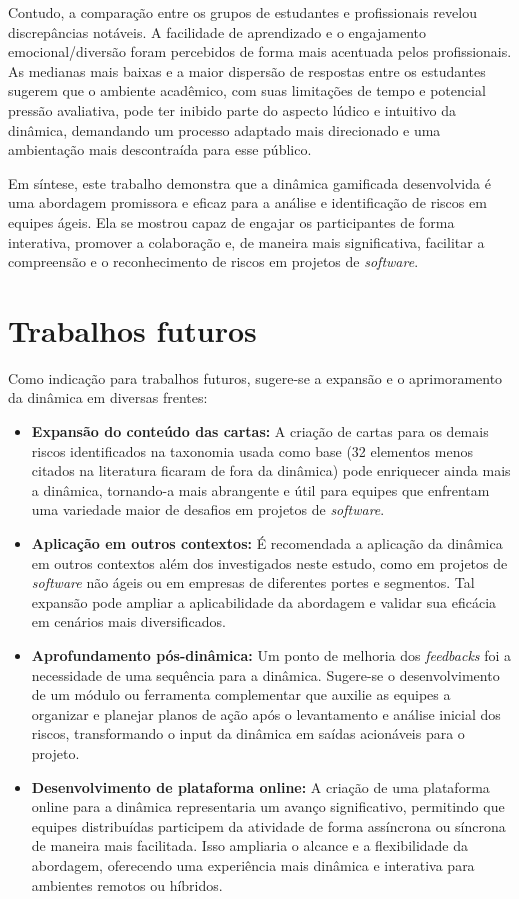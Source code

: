 \documentclass[
	12pt,
	openright,
	twoside,
	a4paper,
	english,
	brazil
	]{abntex2}
\begin{document}
Contudo, a comparação entre os grupos de estudantes e profissionais revelou discrepâncias notáveis. A facilidade de aprendizado e o engajamento emocional/diversão foram percebidos de forma mais acentuada pelos profissionais. As medianas mais baixas e a maior dispersão de respostas entre os estudantes sugerem que o ambiente acadêmico, com suas limitações de tempo e potencial pressão avaliativa, pode ter inibido parte do aspecto lúdico e intuitivo da dinâmica, demandando um processo adaptado mais direcionado e uma ambientação mais descontraída para esse público.

Em síntese, este trabalho demonstra que a dinâmica gamificada desenvolvida é uma abordagem promissora e eficaz para a análise e identificação de riscos em equipes ágeis. Ela se mostrou capaz de engajar os participantes de forma interativa, promover a colaboração e, de maneira mais significativa, facilitar a compreensão e o reconhecimento de riscos em projetos de \textit{software}.

\section{Trabalhos futuros}
\label{sec:trabalhos-futuros}

Como indicação para trabalhos futuros, sugere-se a expansão e o aprimoramento da dinâmica em diversas frentes:

\begin{itemize}
\item \textbf{Expansão do conteúdo das cartas:} A criação de cartas para os demais riscos identificados na taxonomia usada como base \cite{Taxonomy} (32 elementos menos citados na literatura ficaram de fora da dinâmica) pode enriquecer ainda mais a dinâmica, tornando-a mais abrangente e útil para equipes que enfrentam uma variedade maior de desafios em projetos de \textit{software}.
\item \textbf{Aplicação em outros contextos:} É recomendada a aplicação da dinâmica em outros contextos além dos investigados neste estudo, como em projetos de \textit{software} não ágeis ou em empresas de diferentes portes e segmentos. Tal expansão pode ampliar a aplicabilidade da abordagem e validar sua eficácia em cenários mais diversificados.
\item \textbf{Aprofundamento pós-dinâmica:} Um ponto de melhoria dos \textit{feedbacks} foi a necessidade de uma sequência para a dinâmica. Sugere-se o desenvolvimento de um módulo ou ferramenta complementar que auxilie as equipes a organizar e planejar planos de ação após o levantamento e análise inicial dos riscos, transformando o input da dinâmica em saídas acionáveis para o projeto.
\item \textbf{Desenvolvimento de plataforma online:} A criação de uma plataforma online para a dinâmica representaria um avanço significativo, permitindo que equipes distribuídas participem da atividade de forma assíncrona ou síncrona de maneira mais facilitada. Isso ampliaria o alcance e a flexibilidade da abordagem, oferecendo uma experiência mais dinâmica e interativa para ambientes remotos ou híbridos.
\end{itemize}
\end{document}
